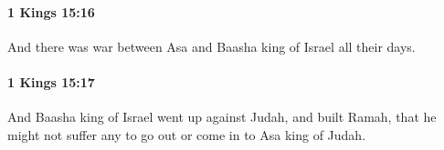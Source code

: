 		\paragraph{1 Kings 15:16} %
			\label{1KINGS-15-16}

			And there was war between Asa and Baasha king of Israel all their days.


		\paragraph{1 Kings 15:17} %
			\label{1KINGS-15-17}

			And Baasha king of Israel went up against Judah, and built Ramah, that he might not suffer any to go out or come in to Asa king of Judah.


